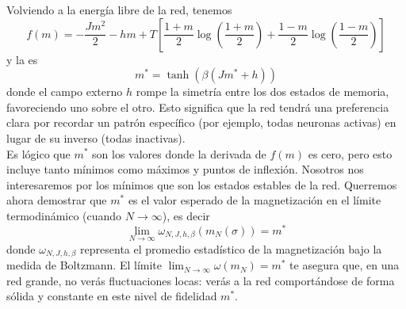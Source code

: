 \noindent
Volviendo a la energía libre de la red, tenemos
\begin{equation*}
    f(m) = -\frac{Jm^2}{2} - hm + T \left[ \dfrac{1+m}{2} \log \left(\frac{1+m}{2}\right) + \frac{1-m}{2} \log \left(\frac{1-m}{2}\right) \right]
\end{equation*}
y la  es
\begin{equation*}
    m^* = \tanh(\beta (Jm^* + h))
\end{equation*}
donde el campo externo $h$ rompe la simetría entre los dos estados de memoria, favoreciendo uno sobre el otro. Esto significa que la red tendrá una preferencia clara por recordar un patrón específico (por ejemplo, todas neuronas activas) en lugar de su inverso (todas inactivas). \\

\noindent
Es lógico que $m^*$ son los valores donde la derivada de $f(m)$ es cero, pero esto incluye tanto mínimos como máximos y puntos de inflexión. Nosotros nos interesaremos por los mínimos que son los estados estables de la red. Querremos ahora demostrar que $m^*$ es el valor esperado de la magnetización en el límite termodinámico (cuando $N\to \infty$), es decir
\begin{equation*}
    \lim_{N\to \infty} \omega_{N,J,h,\beta}(m_N(\sigma)) = m^*
\end{equation*}
donde $\omega_{N,J,h,\beta}$ representa el promedio estadístico de la magnetización bajo la medida de Boltzmann. El límite $\lim_{N\to \infty} \omega(m_N) = m^*$ te asegura que, en una red grande, no verás fluctuaciones locas: verás a la red comportándose de forma sólida y constante en este nivel de fidelidad $m^*$. \\

